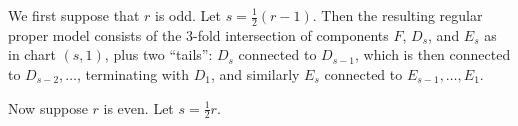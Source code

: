 \documentclass[pagesize,paper=letter]{scrartcl}
\theoremstyle{plain}
\theoremstyle{definition}
\theoremstyle{remark}
\begin{document}
We first suppose that $r$ is odd. Let $s = \frac12(r-1)$. Then the resulting regular proper model consists of the 3-fold intersection of components $F$, $D_s$, and $E_s$ as in chart $(s, 1)$, plus two ``tails'': $D_s$ connected to $D_{s-1}$, which is then connected to $D_{s-2}, \dots$, terminating with $D_1$, and similarly $E_s$ connected to $E_{s-1}, \dots, E_1$.

Now suppose $r$ is even. Let $s = \frac12 r$.



\end{document}
